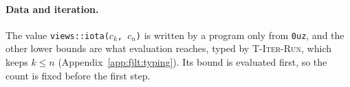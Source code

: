 \paragraph{Data and iteration.}
The value \texttt{views::iota(}$c_k$\texttt{, }$c_n$\texttt{)} is written by a program only from \texttt{0uz}, and the other lower bounds are what evaluation reaches, typed by \textsc{T-Iter-Run}, which keeps $k \le n$ (Appendix~\ref{app:fjlt:typing}).
Its bound is evaluated first, so the count is fixed before the first step.
